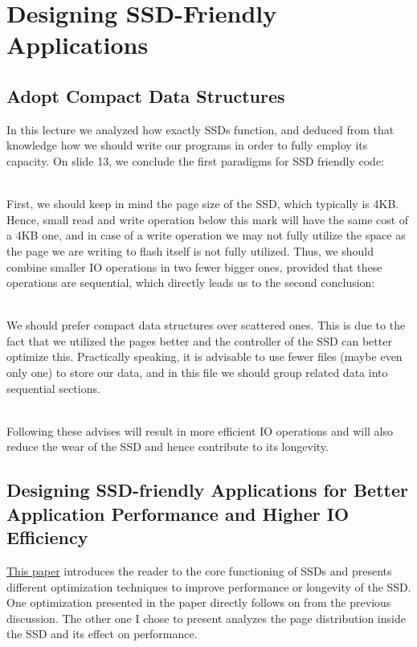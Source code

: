\documentclass[../../main.tex]{subfiles}
\begin{document}
\section{Designing SSD-Friendly Applications}
\subsection{Adopt Compact Data Structures}
In this lecture we analyzed how exactly SSDs function, and deduced from that knowledge how we should write our programs in order to fully employ its capacity. On slide 13, we conclude the first paradigms for SSD friendly code:

~\\
First, we should keep in mind the page size of the SSD, which typically is 4KB. Hence, small read and write operation below this mark will have the same cost of a 4KB one, and in case of a write operation we may not fully utilize the space as the page we are writing to flash itself is not fully utilized. Thus, we should combine smaller IO operations in two fewer bigger ones, provided that these operations are sequential, which directly leads us to the second conclusion:

~\\
We should prefer compact data structures over scattered ones. This is due to the fact that we utilized the pages better and the controller of the SSD can better optimize this. Practically speaking, it is advisable to use fewer files (maybe even only one) to store our data, and in this file we should group related data into sequential sections.

~\\
Following these advises will result in more efficient IO operations and will also reduce the wear of the SSD and hence contribute to its longevity.


\bigskip
\subsection{Designing SSD-friendly Applications for Better Application Performance and Higher IO Efficiency}
\href{https://ieeexplore.ieee.org/stamp/stamp.jsp?tp=&arnumber=7552037}{This paper} introduces the reader to the core functioning of SSDs and presents different optimization techniques to improve performance or longevity of the SSD. One optimization presented in the paper directly follows on from the previous discussion. The other one I chose to present analyzes the page distribution inside the SSD and its effect on performance.
\end{document}
